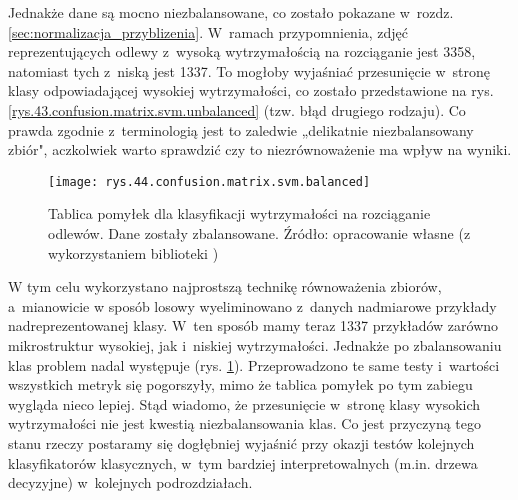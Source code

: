 Jednakże dane są mocno niezbalansowane, co zostało pokazane w~rozdz. \ref{sec:normalizacja_przyblizenia}. W~ramach przypomnienia, zdjęć reprezentujących odlewy z~wysoką wytrzymałością na rozciąganie jest 3358, natomiast tych z~niską jest 1337. To mogłoby wyjaśniać przesunięcie w~stronę klasy odpowiadającej wysokiej wytrzymałości, co zostało przedstawione na rys. \ref{rys.43.confusion.matrix.svm.unbalanced} (tzw. błąd drugiego rodzaju). Co prawda zgodnie z~terminologią jest to zaledwie „delikatnie niezbalansowany zbiór", aczkolwiek warto sprawdzić czy to niezrównoważenie ma wpływ na wyniki.
\begin{figure}[h]
    \centering
    \texttt{[image: rys.44.confusion.matrix.svm.balanced]}
    \caption{Tablica pomyłek dla klasyfikacji wytrzymałości na rozciąganie odlewów. Dane zostały zbalansowane. Źródło: opracowanie własne (z wykorzystaniem biblioteki )}
    \label{rys.44.confusion.matrix.svm.balanced}
\end{figure}
W tym celu wykorzystano najprostszą technikę równoważenia zbiorów, a~mianowicie w sposób losowy wyeliminowano z~danych nadmiarowe przykłady nadreprezentowanej klasy. W~ten sposób mamy teraz 1337 przykładów zarówno mikrostruktur wysokiej, jak i~niskiej wytrzymałości. Jednakże po zbalansowaniu klas problem nadal występuje (rys. \ref{rys.44.confusion.matrix.svm.balanced}). Przeprowadzono te same testy i~wartości wszystkich metryk się pogorszyły, mimo że tablica pomyłek po tym zabiegu wygląda nieco lepiej. Stąd wiadomo, że przesunięcie w~stronę klasy wysokich wytrzymałości nie jest kwestią niezbalansowania klas. Co jest przyczyną tego stanu rzeczy postaramy się dogłębniej wyjaśnić przy okazji testów kolejnych klasyfikatorów klasycznych, w~tym bardziej interpretowalnych (m.in. drzewa decyzyjne) w~kolejnych podrozdziałach.


